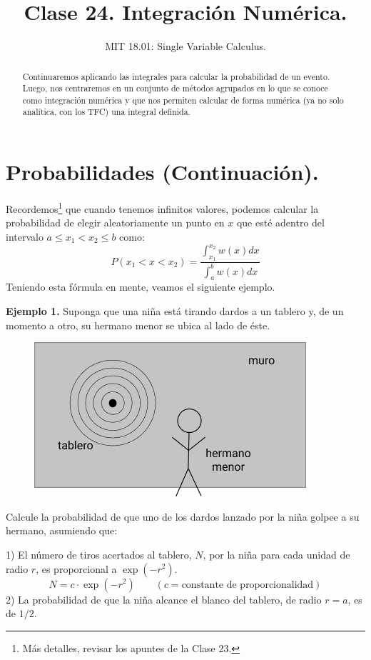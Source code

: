 \documentclass[12pt]{article}
\title{Clase 24. Integración Numérica.}
\author{MIT 18.01: Single Variable Calculus.}
\date{}
\begin{document}
\maketitle

\begin{abstract}
\noindent Continuaremos aplicando las integrales para calcular la probabilidad de un evento. Luego, nos centraremos en un conjunto de métodos agrupados en lo que se conoce como integración numérica y que nos permiten calcular de forma numérica (ya no solo analítica, con los TFC) una integral definida.
\end{abstract}


\section{Probabilidades (Continuación).}

Recordemos\footnote{Más detalles, revisar los apuntes de la Clase 23.} que cuando tenemos infinitos valores, podemos calcular la probabilidad de elegir aleatoriamente un punto en $x$  que esté adentro del intervalo $a \leq x_{1} < x_{2} \leq b$ como:
\[
  P(x_{1} < x < x_{2}) = \frac{\int_{x_{1}}^{x_{2}} w(x)dx}{\int_{a}^{b} w(x)dx}
\]
Teniendo esta fórmula en mente, veamos el siguiente ejemplo.

\textbf{Ejemplo 1.} Suponga que una niña está tirando dardos a un tablero y, de un momento a otro, su hermano menor se ubica al lado de éste.

\begin{figure}[hbt!]
\centering
\includegraphics[scale=0.6]{img/darts-prob-example-1.jpg}
\end{figure}

\newpage

Calcule la probabilidad de que uno de los dardos lanzado por la niña golpee a su hermano, asumiendo que:

1) El número de tiros acertados al tablero, $N$, por la niña para cada unidad de radio $r$, es proporcional a $\exp(-r^{2})$.
\[
  N = c \cdot \exp(-r^{2}) \qquad (c = \text{constante de proporcionalidad})
\]
2) La probabilidad de que la niña alcance el blanco del tablero, de radio $r = a$, es de $1/2$.
\end{document}
